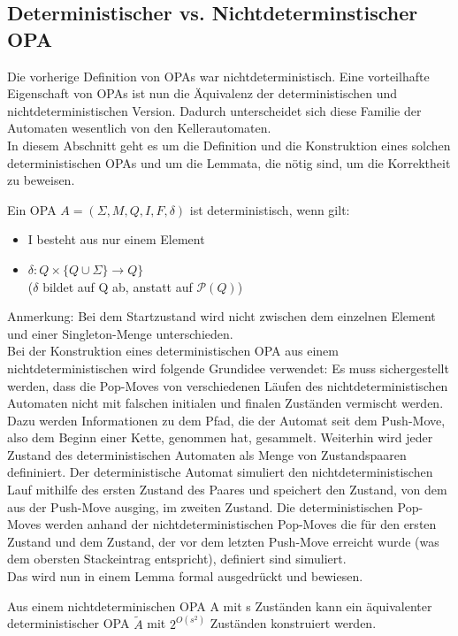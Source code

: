 \subsection{Deterministischer vs. Nichtdeterminstischer OPA}
Die vorherige Definition von OPAs war nichtdeterministisch. Eine vorteilhafte Eigenschaft von OPAs ist nun die Äquivalenz der deterministischen und nichtdeterministischen Version. Dadurch unterscheidet sich diese Familie der Automaten wesentlich von den Kellerautomaten. \\
In diesem Abschnitt geht es um die Definition und die Konstruktion eines solchen deterministischen OPAs und um die Lemmata, die nötig sind, um die Korrektheit zu beweisen. \cite{precedence_automata}
\begin{definition}
Ein OPA $A=(\Sigma, M, Q, I, F, \delta)$ ist deterministisch, wenn gilt:
\begin{itemize}
\item
I besteht aus nur einem Element 
\item
$\delta: Q \times \{Q \cup \Sigma\} \rightarrow Q\}$ \\
($\delta$ bildet auf Q ab, anstatt auf $\mathcal{P}(Q)$)
\end{itemize}
\end{definition}
Anmerkung: Bei dem Startzustand wird nicht zwischen dem einzelnen Element und einer Singleton-Menge unterschieden.\\
Bei der Konstruktion eines deterministischen OPA aus einem nichtdeterministischen wird folgende Grundidee verwendet: Es muss sichergestellt werden, dass die Pop-Moves von verschiedenen Läufen des nichtdeterministischen Automaten nicht mit falschen initialen und finalen Zuständen vermischt werden. Dazu werden Informationen zu dem Pfad, die der Automat seit dem Push-Move, also dem Beginn einer Kette, genommen hat, gesammelt. Weiterhin wird jeder Zustand des deterministischen Automaten als Menge von Zustandspaaren defininiert. Der deterministische Automat simuliert den nichtdeterministischen Lauf mithilfe des ersten Zustand des Paares und speichert den Zustand, von dem aus der Push-Move ausging, im zweiten Zustand. Die deterministischen Pop-Moves werden anhand  der nichtdeterministischen Pop-Moves die für den ersten Zustand und dem Zustand, der vor dem letzten Push-Move erreicht wurde (was dem obersten Stackeintrag entspricht), definiert sind simuliert.\\
Das wird nun in einem Lemma formal ausgedrückt und bewiesen.
\begin{lemma}
\label{lemma_Deter}
Aus einem nichtdeterminischen OPA A mit s Zuständen kann ein äquivalenter deterministischer OPA $\tilde{A}$ mit $2^{O(s^2)}$ Zuständen konstruiert werden.
\end{lemma}
